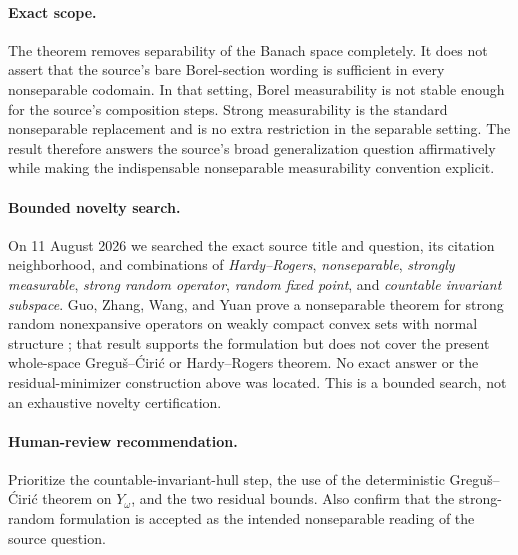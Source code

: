 \documentclass[11pt]{article}
\begin{document}
\paragraph{Exact scope.}
The theorem removes separability of the Banach space completely.  It does not
assert that the source's bare Borel-section wording is sufficient in every
nonseparable codomain.  In that setting, Borel measurability is not stable
enough for the source's composition steps.  Strong measurability is the
standard nonseparable replacement and is no extra restriction in the
separable setting.  The result therefore answers the source's broad
generalization question affirmatively while making the indispensable
nonseparable measurability convention explicit.

\paragraph{Bounded novelty search.}
On 11 August 2026 we searched the exact source title and question, its citation
neighborhood, and combinations of \emph{Hardy--Rogers}, \emph{nonseparable},
\emph{strongly measurable}, \emph{strong random operator}, \emph{random fixed
point}, and \emph{countable invariant subspace}.  Guo, Zhang, Wang, and Yuan
prove a nonseparable theorem for strong random nonexpansive operators on
weakly compact convex sets with normal structure \cite{guo}; that result
supports the formulation but does not cover the present whole-space
Gregu\v{s}--\'{C}iri\'{c} or Hardy--Rogers theorem.  No exact answer or the
residual-minimizer construction above was located.  This is a bounded search,
not an exhaustive novelty certification.

\paragraph{Human-review recommendation.}
Prioritize the countable-invariant-hull step, the use of the deterministic
Gregu\v{s}--\'{C}iri\'{c} theorem on $Y_\omega$, and the two residual bounds.
Also confirm that the strong-random formulation is accepted as the intended
nonseparable reading of the source question.
\end{document}
